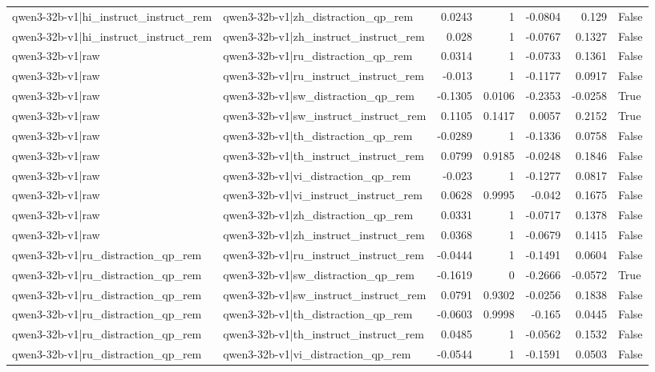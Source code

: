 \begin{table}
\begin{tabular}{l l r r r r l}
qwen3-32b-v1|hi_instruct_instruct_rem & qwen3-32b-v1|zh_distraction_qp_rem & 0.0243 & 1 & -0.0804 & 0.129 & False \\
qwen3-32b-v1|hi_instruct_instruct_rem & qwen3-32b-v1|zh_instruct_instruct_rem & 0.028 & 1 & -0.0767 & 0.1327 & False \\
qwen3-32b-v1|raw & qwen3-32b-v1|ru_distraction_qp_rem & 0.0314 & 1 & -0.0733 & 0.1361 & False \\
qwen3-32b-v1|raw & qwen3-32b-v1|ru_instruct_instruct_rem & -0.013 & 1 & -0.1177 & 0.0917 & False \\
qwen3-32b-v1|raw & qwen3-32b-v1|sw_distraction_qp_rem & -0.1305 & 0.0106 & -0.2353 & -0.0258 & True \\
qwen3-32b-v1|raw & qwen3-32b-v1|sw_instruct_instruct_rem & 0.1105 & 0.1417 & 0.0057 & 0.2152 & True \\
qwen3-32b-v1|raw & qwen3-32b-v1|th_distraction_qp_rem & -0.0289 & 1 & -0.1336 & 0.0758 & False \\
qwen3-32b-v1|raw & qwen3-32b-v1|th_instruct_instruct_rem & 0.0799 & 0.9185 & -0.0248 & 0.1846 & False \\
qwen3-32b-v1|raw & qwen3-32b-v1|vi_distraction_qp_rem & -0.023 & 1 & -0.1277 & 0.0817 & False \\
qwen3-32b-v1|raw & qwen3-32b-v1|vi_instruct_instruct_rem & 0.0628 & 0.9995 & -0.042 & 0.1675 & False \\
qwen3-32b-v1|raw & qwen3-32b-v1|zh_distraction_qp_rem & 0.0331 & 1 & -0.0717 & 0.1378 & False \\
qwen3-32b-v1|raw & qwen3-32b-v1|zh_instruct_instruct_rem & 0.0368 & 1 & -0.0679 & 0.1415 & False \\
qwen3-32b-v1|ru_distraction_qp_rem & qwen3-32b-v1|ru_instruct_instruct_rem & -0.0444 & 1 & -0.1491 & 0.0604 & False \\
qwen3-32b-v1|ru_distraction_qp_rem & qwen3-32b-v1|sw_distraction_qp_rem & -0.1619 & 0 & -0.2666 & -0.0572 & True \\
qwen3-32b-v1|ru_distraction_qp_rem & qwen3-32b-v1|sw_instruct_instruct_rem & 0.0791 & 0.9302 & -0.0256 & 0.1838 & False \\
qwen3-32b-v1|ru_distraction_qp_rem & qwen3-32b-v1|th_distraction_qp_rem & -0.0603 & 0.9998 & -0.165 & 0.0445 & False \\
qwen3-32b-v1|ru_distraction_qp_rem & qwen3-32b-v1|th_instruct_instruct_rem & 0.0485 & 1 & -0.0562 & 0.1532 & False \\
qwen3-32b-v1|ru_distraction_qp_rem & qwen3-32b-v1|vi_distraction_qp_rem & -0.0544 & 1 & -0.1591 & 0.0503 & False \\

\end{tabular}
\end{table}
